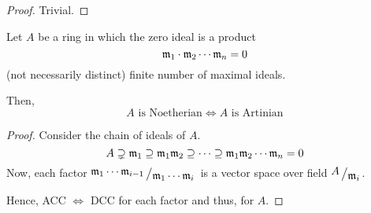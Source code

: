 \begin{proof}
	Trivial.
\end{proof}


\begin{corollary}{}{}
	Let \(A\) be a ring in which the zero ideal is a product
	\[
		\mathfrak{m}_1 \cdot \mathfrak{m}_2 \cdots \mathfrak{m}_n = 0
	\]
	(not necessarily distinct) finite number of maximal ideals.

	Then,
	\[
		A \text{ is Noetherian} \iff A \text{ is Artinian}
	\]
\end{corollary}

\begin{proof}
	Consider the chain of ideals of \(A\).
	\[
		A \supsetneq \mathfrak{m}_1 \supseteq \mathfrak{m}_1 \mathfrak{m}_2 \supseteq \dots
		\supseteq \mathfrak{m}_1 \mathfrak{m}_2 \cdots \mathfrak{m}_n = 0
	\]
	Now, each factor \(\bigslant{\mfm_1 \cdots \mfm_{i-1}}
	{\mfm_1 \cdots \mfm_i}\) is a vector space over field
	\(\bigslant{A}{\mfm_i}\).

	Hence, ACC \(\iff\) DCC for each factor and thus, for \(A\).
\end{proof}